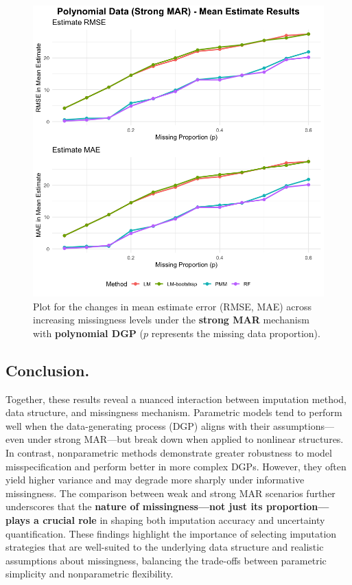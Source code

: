\documentclass[12pt,oneside]{amsart}
\theoremstyle{definition}
\theoremstyle{remark}
\numberwithin{equation}{section}
\begin{document}
\begin{figure}[ht]
\begin{minipage}[b]{0.48\linewidth}
        \includegraphics[width=\linewidth]{Report/Figure/mean_poly_mar.jpg}
        \caption{Plot for the changes in mean estimate error (RMSE, MAE) across increasing missingness levels under the \textbf{strong MAR} mechanism with \textbf{polynomial DGP} ($p$ represents the missing data proportion).}
        \label{fig:mean_poly_mar}
    \end{minipage}
\end{figure}
\subsection{Conclusion.}
Together, these results reveal a nuanced interaction between imputation method, data structure, and missingness mechanism. Parametric models tend to perform well when the data-generating process (DGP) aligns with their assumptions—even under strong MAR—but break down when applied to nonlinear structures. In contrast, nonparametric methods demonstrate greater robustness to model misspecification and perform better in more complex DGPs. However, they often yield higher variance and may degrade more sharply under informative missingness. The comparison between weak and strong MAR scenarios further underscores that the \textbf{nature of missingness—not just its proportion—plays a crucial role} in shaping both imputation accuracy and uncertainty quantification. These findings highlight the importance of selecting imputation strategies that are well-suited to the underlying data structure and realistic assumptions about missingness, balancing the trade-offs between parametric simplicity and nonparametric flexibility.

\clearpage
\printbibliography
\end{document}

